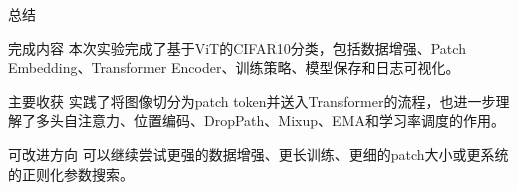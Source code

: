 \documentclass[aspectratio=169,10pt]{ctexbeamer}
\begin{document}
\begin{frame}{总结}
	\begin{block}{完成内容}
		本次实验完成了基于ViT的CIFAR10分类，包括数据增强、Patch Embedding、Transformer Encoder、训练策略、模型保存和日志可视化。
	\end{block}

	\begin{block}{主要收获}
		实践了将图像切分为patch token并送入Transformer的流程，也进一步理解了多头自注意力、位置编码、DropPath、Mixup、EMA和学习率调度的作用。
	\end{block}

	\begin{block}{可改进方向}
		可以继续尝试更强的数据增强、更长训练、更细的patch大小或更系统的正则化参数搜索。
	\end{block}
\end{frame}
\end{document}

